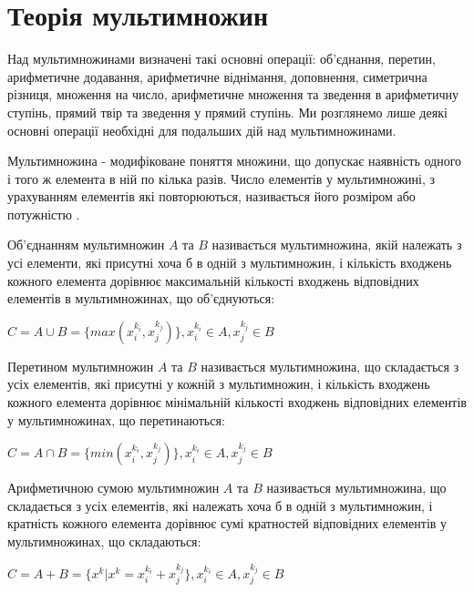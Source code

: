 \section{Теорія мультимножин}

Над мультимножинами визначені такі основні операції: об'єднання, перетин, арифметичне додавання, арифметичне віднімання, доповнення, симетрична різниця, множення на число, арифметичне множення та зведення в арифметичну ступінь, прямий твір та зведення у прямий ступінь. Ми розглянемо лише деякі основні операції необхідні для подальших дій над мультимножинами.

\begin{definition}
Мультимножина - модифіковане поняття множини, що допускає наявність одного і того ж елемента в ній по кілька разів. Число елементів у мультимножині, з урахуванням елементів які повторюються, називається його розміром або потужністю \cite{Kapitonova:2004}.
\end{definition}

\begin{definition}
Об'єднанням мультимножин \cite{Kapitonova:2004} $A$ та $B$ називається мультимножина, якій належать з усі елементи, які присутні хоча б в одній з мультимножин, і кількість входжень кожного елемента дорівнює максимальній кількості входжень відповідних елементів в мультимножинах, що об'єднуються:
\begin{center}
$C = A \cup B = \{max(x_i^{k_i}, x_j^{k_j})\}, x_i^{k_i} \in A, x_j^{k_j} \in B$
\end{center}
\end{definition}

\begin{definition}
Перетином мультимножин \cite{Kapitonova:2004} $A$ та $B$ називається мультимножина, що складається з усіх елементів, які присутні у кожній з мультимножин, і кількість входжень кожного елемента дорівнює мінімальній кількості входжень відповідних елементів у мультимножинах, що перетинаються:
\begin{center}
$C = A \cap B = \{min(x_i^{k_i}, x_j^{k_j})\}, x_i^{k_i} \in A, x_j^{k_j} \in B$
\end{center}
\end{definition}

\begin{definition}
Арифметичною сумою мультимножин \cite{Kapitonova:2004} $A$ та $B$ називається мультимножина, що складається з усіх елементів, які належать хоча б в одній з мультимножин, і кратність кожного елемента дорівнює сумі кратностей відповідних елементів у мультимножинах, що складаються:
\begin{center}
$C = A + B = \{x^k | x^k = x_i^{k_i} + x_j^{k_j}\}, x_i^{k_i} \in A, x_j^{k_j} \in B$
\end{center}
\end{definition}


